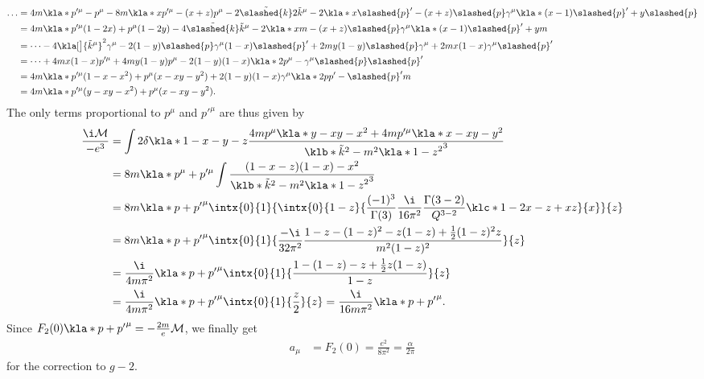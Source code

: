 \documentclass[english, parskip=full]{scrbook}
\begin{document}
\begin{align}
\dots &= 4m\kla*{p'^\mu-p^\mu } - 8m\kla*{xp'^\mu - (x+z)p^\mu } - 2\tilde{\slashed{k}} 2\tilde{k}^\mu - 2\kla*{x\slashed{p}'-(x+z)\slashed{p}} \gamma^\mu \kla*{(x-1)\slashed{p}' + y\slashed{p}}\\
&= 4m\kla*{p'^\mu (1-2x) + p^\mu (1-2y)} - 4\tilde{\slashed{k}} \tilde{k}^\mu - 2\kla*{xm-(x+z)\slashed{p}}\gamma^\mu \kla*{(x-1)\slashed{p}'+ym}\\
&= \dots - 4\kla[\big]{\tilde{k}^\mu }^2\gamma^\mu -2(1-y)\slashed{p}\gamma^\mu (1-x)\slashed{p}' + 2my(1-y)\slashed{p}\gamma^\mu + 2mx(1-x)\gamma^\mu\slashed{p}'\\
&= \dots + 4mx(1-x) p'^\mu + 4my(1-y) p^\mu - 2(1-y)(1-x) \kla*{2p^\mu - \gamma^\mu \slashed{p}}\slashed{p}'\\
&= 4m\kla*{p'^\mu (1-x-x^2) + p^\mu (x-xy-y^2)} + 2(1-y)(1-x) \gamma^\mu \kla*{2pp' -\slashed{p}'m}\\
&= 4m\kla*{p'^\mu (y-xy-x^2) + p^\mu (x-xy-y^2)}.
\end{align}
The only terms proportional to $p^\mu$ and $p'^\mu$ are thus given by
\begin{align}
\frac{\i\mathcal{M}}{-e^3} &= \int 2\delta\kla*{1-x-y-z}\frac{4m p^\mu \kla*{y-xy-x^2} + 4m p'^\mu \kla*{x-xy-y^2}}{\klb*{\tilde{k}^2 - m^2\kla*{1-z}^2}^3} \\
&= 8m\kla*{p^\mu+p'^\mu } \int \frac{(1-x-z)(1-x)-x^2}{\klb*{\tilde{k}^2 - m^2\kla*{1-z}^2}^3}\\
&= 8m\kla*{p+p'}^\mu \intx{0}{1}{\intx{0}{1-z}{\frac{(-1)^3}{\Gamma(3)} \frac{\i}{16\pi^2} \frac{\Gamma(3-2)}{Q^{3-2}} \klc*{1-2x-z+xz} }{x}}{z} \\
&= 8m\kla*{p+p'}^\mu \intx{0}{1}{ \frac{-\i}{32\pi^2} \frac{1-z - (1-z)^2 - z(1-z) + \frac{1}{2}(1-z)^2z}{m^2 (1-z)^2} }{z} \\
&= \frac{\i}{4m\pi^2} \kla*{p+p'}^\mu \intx{0}{1}{\frac{1 - (1-z) - z + \frac{1}{2}z(1-z)}{1-z}}{z} \\
&= \frac{\i}{4m\pi^2} \kla*{p+p'}^\mu \intx{0}{1}{\frac{z}{2}}{z} = \frac{\i}{16m\pi^2} \kla*{p+p'}^\mu.
\end{align}
Since $F_2(0) \kla*{p+p'}^\mu = -\frac{2m}{e} \mathcal{M}$, we finally get
\begin{align}
a_\mu &= F_2(0) = \frac{e^2}{8\pi^2} = \frac{\alpha}{2\pi}
\end{align}
for the correction to $g-2$.
\end{document}
